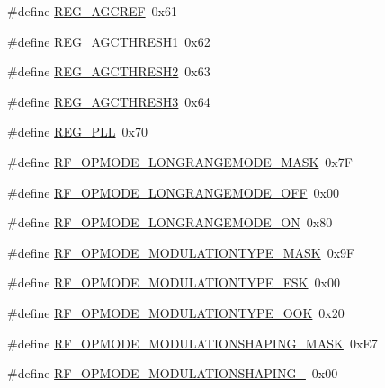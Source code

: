 \begin{DoxyCompactItemize}
\#define \mbox{\hyperlink{sx1276_regs-_fsk_8h_a3dc004091d7cb3015aff5967e09b77d8}{R\+E\+G\+\_\+\+A\+G\+C\+R\+EF}}~0x61
\item 
\#define \mbox{\hyperlink{sx1276_regs-_fsk_8h_a1d0f8f390ec3b351e10e37e7258ca6df}{R\+E\+G\+\_\+\+A\+G\+C\+T\+H\+R\+E\+S\+H1}}~0x62
\item 
\#define \mbox{\hyperlink{sx1276_regs-_fsk_8h_ac3b7b366f9a287e32a0be6724909f644}{R\+E\+G\+\_\+\+A\+G\+C\+T\+H\+R\+E\+S\+H2}}~0x63
\item 
\#define \mbox{\hyperlink{sx1276_regs-_fsk_8h_a1686f2ccb6d060e425194a9414fd7ca3}{R\+E\+G\+\_\+\+A\+G\+C\+T\+H\+R\+E\+S\+H3}}~0x64
\item 
\#define \mbox{\hyperlink{sx1276_regs-_fsk_8h_aa5110ddd4aaa720908be259b5a4af489}{R\+E\+G\+\_\+\+P\+LL}}~0x70
\item 
\#define \mbox{\hyperlink{sx1276_regs-_fsk_8h_afd99a116c626b5579054d37c640e175a}{R\+F\+\_\+\+O\+P\+M\+O\+D\+E\+\_\+\+L\+O\+N\+G\+R\+A\+N\+G\+E\+M\+O\+D\+E\+\_\+\+M\+A\+SK}}~0x7F
\item 
\#define \mbox{\hyperlink{sx1276_regs-_fsk_8h_a856e634d884238e300fdf87a2557d670}{R\+F\+\_\+\+O\+P\+M\+O\+D\+E\+\_\+\+L\+O\+N\+G\+R\+A\+N\+G\+E\+M\+O\+D\+E\+\_\+\+O\+FF}}~0x00
\item 
\#define \mbox{\hyperlink{sx1276_regs-_fsk_8h_a1775751bd57cbba5d752ebf2e03c6e1b}{R\+F\+\_\+\+O\+P\+M\+O\+D\+E\+\_\+\+L\+O\+N\+G\+R\+A\+N\+G\+E\+M\+O\+D\+E\+\_\+\+ON}}~0x80
\item 
\#define \mbox{\hyperlink{sx1276_regs-_fsk_8h_a9b3d405d931ad505308b89d2fa029dbb}{R\+F\+\_\+\+O\+P\+M\+O\+D\+E\+\_\+\+M\+O\+D\+U\+L\+A\+T\+I\+O\+N\+T\+Y\+P\+E\+\_\+\+M\+A\+SK}}~0x9F
\item 
\#define \mbox{\hyperlink{sx1276_regs-_fsk_8h_af4f3f4b19fd43491f270fcee634edd13}{R\+F\+\_\+\+O\+P\+M\+O\+D\+E\+\_\+\+M\+O\+D\+U\+L\+A\+T\+I\+O\+N\+T\+Y\+P\+E\+\_\+\+F\+SK}}~0x00
\item 
\#define \mbox{\hyperlink{sx1276_regs-_fsk_8h_af6fe2f62d8ec55fcf40c73ae24bc54ae}{R\+F\+\_\+\+O\+P\+M\+O\+D\+E\+\_\+\+M\+O\+D\+U\+L\+A\+T\+I\+O\+N\+T\+Y\+P\+E\+\_\+\+O\+OK}}~0x20
\item 
\#define \mbox{\hyperlink{sx1276_regs-_fsk_8h_a1b851bfa8cc641cd5a2a0805df4f4762}{R\+F\+\_\+\+O\+P\+M\+O\+D\+E\+\_\+\+M\+O\+D\+U\+L\+A\+T\+I\+O\+N\+S\+H\+A\+P\+I\+N\+G\+\_\+\+M\+A\+SK}}~0x\+E7
\item 
\#define \mbox{\hyperlink{sx1276_regs-_fsk_8h_a1a589ce58d8c5fb2da244d4829d11a3f}{R\+F\+\_\+\+O\+P\+M\+O\+D\+E\+\_\+\+M\+O\+D\+U\+L\+A\+T\+I\+O\+N\+S\+H\+A\+P\+I\+N\+G\+\_}}~0x00

\end{DoxyCompactItemize}
